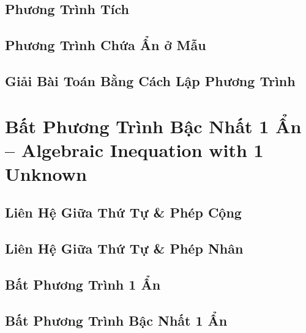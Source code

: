 \documentclass{article}
\numberwithin{equation}{section}
\begin{document}
\subsection{Phương Trình Tích}


\subsection{Phương Trình Chứa Ẩn ở Mẫu}


\subsection{Giải Bài Toán Bằng Cách Lập Phương Trình}


\section{Bất Phương Trình Bậc Nhất 1 Ẩn -- Algebraic Inequation with 1 Unknown}

\subsection{Liên Hệ Giữa Thứ Tự \& Phép Cộng}


\subsection{Liên Hệ Giữa Thứ Tự \& Phép Nhân}


\subsection{Bất Phương Trình 1 Ẩn}


\subsection{Bất Phương Trình Bậc Nhất 1 Ẩn}
\end{document}
